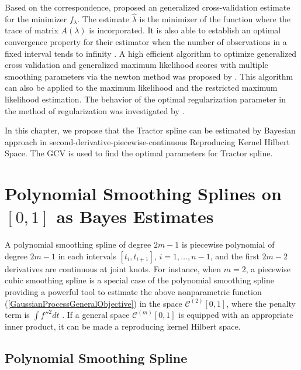 Based on the correspondence, \cite{craven1978smoothing} proposed an generalized cross-validation estimate for the minimizer $f_\lambda$. The estimate $\hat{\lambda}$ is the minimizer of the function where the trace of matrix $A(\lambda)$ is incorporated. It is also able to establish an optimal convergence property for their estimator when the number of observations in a fixed interval tends to infinity \cite{wecker1983signal}. A high efficient  algorithm to optimize generalized cross validation and generalized maximum likelihood scores with multiple smoothing parameters via the newton method was proposed by \cite{gu1991minimizing}. This algorithm can also be applied to the maximum likelihood and the restricted maximum  likelihood estimation. The behavior of the optimal regularization parameter in the method of regularization was investigated by \cite{wahba1990optimal}. 




In this chapter, we propose that the Tractor spline can be estimated by Bayesian approach in second-derivative-piecewise-continuous Reproducing Kernel Hilbert Space. The GCV is used to find the optimal parameters for Tractor spline. 



\section{Polynomial Smoothing Splines on $[0, 1]$ as Bayes Estimates}

A polynomial smoothing spline of degree $2m-1$ is piecewise polynomial of degree $2m-1$ in each intervals $[t_i,t_{i+1}]$, $i=1, \ldots, n-1$, and the first $2m-2$ derivatives are continuous at joint knots. For instance, when $m=2$,  a piecewise cubic smoothing spline is a special case of the polynomial smoothing spline providing a powerful tool to estimate the above nonparametric function (\ref{GaussianProcessGeneralObjective}) in the space  $\mathcal{C}^{(2)}[0,1]$, where the penalty term is $\int f''^2dt$ \cite{hastie1990generalized}. If a general space $\mathcal{C}^{(m)}[0,1]$ is equipped with an appropriate inner product, it can be made a reproducing kernel Hilbert space. 

\subsection{Polynomial Smoothing Spline}

